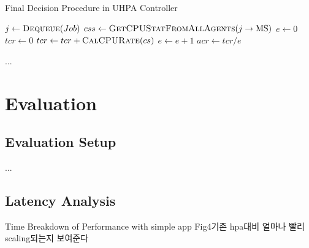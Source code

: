 \documentclass[conference]{IEEEtran}
\begin{document}
\begin{algorithm}[ht!]
    \caption{Final Decision Procedure in UHPA Controller}
    \begin{algorithmic}[1]
        \State $j \gets \Call{Dequeue}{Job}$
        \State $css \gets \Call{GetCPUStatFromAllAgents}{j\rightarrow\text{MS}}$
        \State $e \gets 0$
        \State $tcr \gets 0$
        \State $tcr \gets tcr + \Call{CalCPURate}{cs}$
        \State $e \gets e + 1$
        \EndIf
        \EndFor
        \State $acr \gets tcr / e$
        \State {}
        \EndIf
        \EndWhile
        \label{alg:controller}
    \end{algorithmic}
\end{algorithm}

...




\section{Evaluation}
\subsection{Evaluation Setup}
...

\subsection{Latency Analysis}
Time Breakdown of Performance with simple app
Fig4기존 hpa대비 얼마나 빨리 scaling되는지 보여준다
\end{document}
